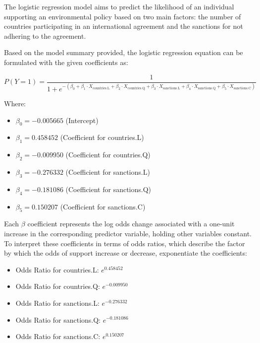 \documentclass[12pt,letterpaper]{article}
\begin{document}
The logistic regression model aims to predict the likelihood of an individual supporting an environmental policy based on two main factors: the number of countries participating in an international agreement and the sanctions for not adhering to the agreement.

Based on the model summary provided, the logistic regression equation can be formulated with the given coefficients as:

\[
P(Y=1) = \frac{1}{1 + e^{-(\beta_0 + \beta_1 \cdot X_{\text{countries.L}} + \beta_2 \cdot X_{\text{countries.Q}} + \beta_3 \cdot X_{\text{sanctions.L}} + \beta_4 \cdot X_{\text{sanctions.Q}} + \beta_5 \cdot X_{\text{sanctions.C}})}}
\]

Where:
\begin{itemize}
    \item \( \beta_0 = -0.005665 \) (Intercept)
    \item \( \beta_1 = 0.458452 \) (Coefficient for countries.L)
    \item \( \beta_2 = -0.009950 \) (Coefficient for countries.Q)
    \item \( \beta_3 = -0.276332 \) (Coefficient for sanctions.L)
    \item \( \beta_4 = -0.181086 \) (Coefficient for sanctions.Q)
    \item \( \beta_5 = 0.150207 \) (Coefficient for sanctions.C)
\end{itemize}

Each \( \beta \) coefficient represents the log odds change associated with a one-unit increase in the corresponding predictor variable, holding other variables constant. To interpret these coefficients in terms of odds ratios, which describe the factor by which the odds of support increase or decrease, exponentiate the coefficients:
\begin{itemize}
    \item Odds Ratio for countries.L: \( e^{0.458452} \)
    \item Odds Ratio for countries.Q: \( e^{-0.009950} \)
    \item Odds Ratio for sanctions.L: \( e^{-0.276332} \)
    \item Odds Ratio for sanctions.Q: \( e^{-0.181086} \)
    \item Odds Ratio for sanctions.C: \( e^{0.150207} \)
\end{itemize}
\end{document}
